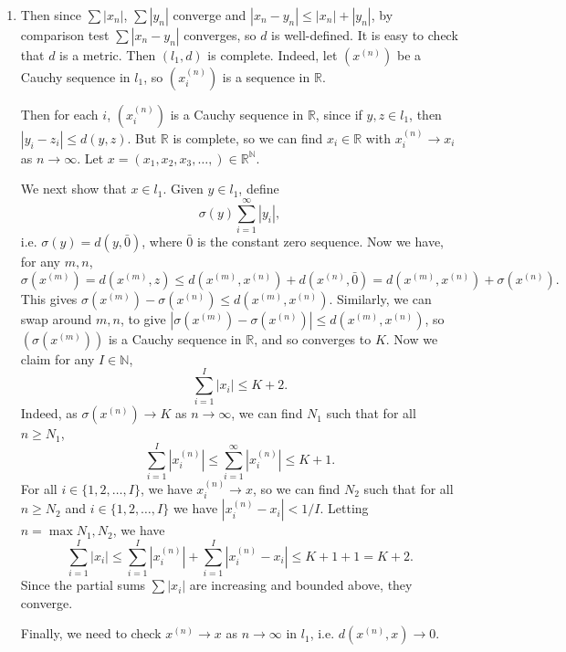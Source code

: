 \documentclass[12pt]{article}
\theoremstyle{definition}
\theoremstyle{remark}
\begin{document}
\begin{adjustbox}{minipage = \columnwidth - 25.5pt, margin=1em, frame=1pt, margin=0em}
\begin{enumerate}
	\item[]
	Then since $\sum |x_n|$, $\sum |y_n|$ converge and $|x_n - y_n| \leq |x_n| + |y_n|$, by comparison test $\sum |x_n - y_n|$ converges, so $d$ is well-defined. It is easy to check that $d$ is a metric. Then $(l_1, d)$ is complete. Indeed, let $(x^{(n)})$ be a Cauchy sequence in $l_1$, so $(x^{(n)}_i)$ is a sequence in $\mathbb{R}$.

		Then for each $i$, $(x^{(n)}_{i})$ is a Cauchy sequence in $\mathbb{R}$, since if $y, z \in l_1$, then $|y_i - z_i| \leq d(y, z)$. But $\mathbb{R}$ is complete, so we can find $x_i \in \mathbb{R}$ with $x^{(n)}_{i} \to x_i$ as $n \to \infty$. Let $x = (x_1, x_2, x_3, \ldots, ) \in \mathbb{R}^{\mathbb{N}}$.

	We next show that $x \in l_1$. Given $y \in l_1$, define
	\[
		\sigma(y) \sum_{i = 1}^{\infty} |y_i|
	,\]
	i.e. $\sigma(y) = d(y, \bar 0)$, where $\bar 0$ is the constant zero sequence. Now we have, for any $m, n$,
	\[
		\sigma(x^{(m)}) = d(x^{(m)}, z) \leq d(x^{(m)}, x^{(n)}) + d(x^{(n)}, \bar 0) = d(x^{(m)}, x^{(n)}) + \sigma(x^{(n)})
	.\]
	This gives $\sigma(x^{(m)}) - \sigma(x^{(n)}) \leq d(x^{(m)}, x^{(n)})$. Similarly, we can swap around $m, n$, to give $|\sigma(x^{(m)}) - \sigma(x^{(n)})| \leq d(x^{(m)}, x^{(n)})$, so $(\sigma(x^{(m)}))$ is a Cauchy sequence in $\mathbb{R}$, and so converges to $K$. Now we claim for any $I \in \mathbb{N}$,
	\[
	\sum_{i = 1}^{I} |x_i| \leq K + 2
	.\]
	Indeed, as $\sigma(x^{(n)}) \to K$ as $n \to \infty$, we can find $N_1$ such that for all $n \geq N_1$,
	\[
		\sum_{i = 1}^{I} |x_i^{(n)}| \leq \sum_{i = 1}^{\infty}|x^{(n)}_i| \leq K + 1
	.\]
	For all $i \in \{1, 2, \ldots, I\}$, we have $x^{(n)}_i \to x$, so we can find $N_2$ such that for all $n \geq N_2$ and $i \in \{1, 2, \ldots, I\}$ we have $|x^{(n)}_i - x_i| < 1/I$. Letting $n = \max{N_1, N_2}$, we have
	\[
		\sum_{i = 1}^{I} |x_i| \leq \sum_{i = 1}^{I} |x^{(n)}_i| + \sum_{i = 1}^{I} |x^{(n)}_i - x_i| \leq K + 1 + 1 = K + 2
	.\]
	Since the partial sums $\sum |x_i|$ are increasing and bounded above, they converge.

	Finally, we need to check $x^{(n)} \to x$ as $n \to \infty$ in $l_1$, i.e. $d(x^{(n)}, x) \to 0$.
\end{enumerate}

\end{adjustbox}
\end{document}
